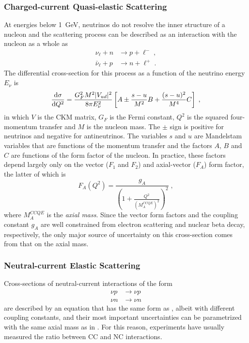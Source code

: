 \subsubsection{Charged-current Quasi-elastic Scattering}
At energies below \SI{1}{GeV}, neutrinos do not resolve the inner structure of a nucleon and the scattering process can be described as an interaction with the nucleon as a whole as
\begin{equation}
\begin{aligned}
    \nu_\ell + n &\rightarrow p + \ell^-\;,\\
    \bar{\nu}_\ell + p &\rightarrow n + \ell^+\;.
\end{aligned}
\end{equation}
The differential cross-section for this process as a function of the neutrino energy $E_\nu$ is
\begin{equation}
    \frac{\mathrm{d}\sigma}{\mathrm{d} Q^2} = \frac{G_F^2 M^2 |V_{ud}|^2}{8\pi E^2_\nu}
    \left[
        A \pm \frac{s-u}{M^2}B + \frac{(s-u)^2}{M^4}C
    \right]\;,\label{eq:ccqe-xsec}
\end{equation}
in which $V$ is the CKM matrix, $G_F$ is the Fermi constant, $Q^2$ is the squared four-momentum transfer and $M$ is the nucleon mass.
The $\pm$ sign is positive for neutrinos and negative for antineutrinos.
The variables $s$ and $u$ are Mandelstam variables that are functions of the momentum transfer and the factors $A$, $B$ and $C$ are functions of the form factor of the nucleon.
In practice, these factors depend largely only on the vector ($F_1$ and $F_2$) and axial-vector ($F_A$) form factor, the latter of which is
\begin{equation}
    F_A(Q^2) = \frac{g_A}{\left(1 + \frac{Q^2}{(M_A^{CCQE})^2}\right)^2}\;,\label{eq:axial-mass-form-factor}
\end{equation}
where $M_A^{CCQE}$ is the \emph{axial mass}.
Since the vector form factors and the coupling constant $g_A$ are well constrained from electron scattering and nuclear beta decay, respectively, the only major source of uncertainty on this cross-section comes from that on the axial mass.

\subsubsection{Neutral-current Elastic Scattering}
Cross-sections of neutral-current interactions of the form
\begin{equation}
\begin{aligned}
    \nu p &\rightarrow \nu p \\
    \nu n &\rightarrow \nu n
\end{aligned}
\end{equation}
are described by an equation that has the same form as , albeit with different coupling constants, and their most important uncertainties can be parametrized with the same axial mass as in .
For this reason, experiments have usually measured the ratio between CC and NC interactions.

